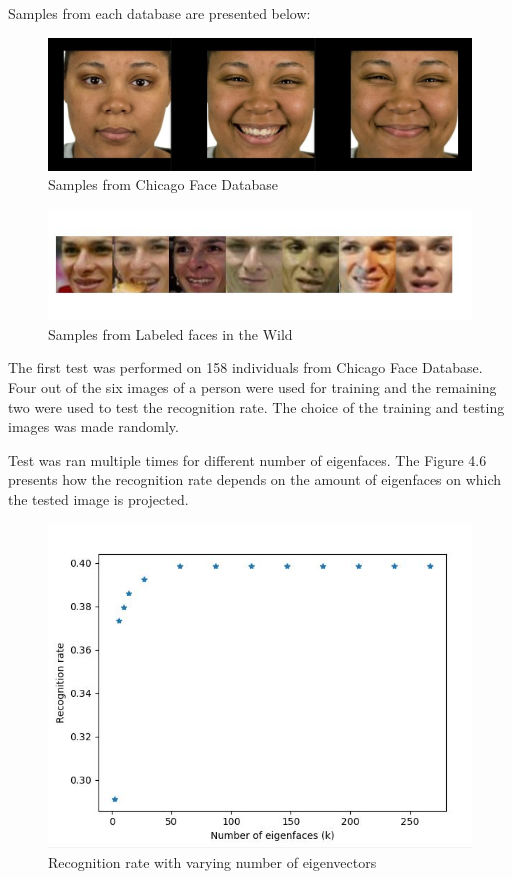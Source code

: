 Samples from each database are presented below:

\begin{figure}[H]
\centering
\includegraphics[scale=0.3]{CFD_samples.jpg}
\caption{Samples from Chicago Face Database}
\end{figure} 


\begin{figure}[H]
\centering
\includegraphics[scale=0.7]{lfw_samples.jpg}
\caption{Samples from Labeled faces in the Wild}
\end{figure} 

The first test was performed on 158 individuals from Chicago Face Database. Four out of the six images of a person were used for training and the remaining two were used to test the recognition rate. The choice of the training and testing images was made randomly.

Test was ran multiple times for different number of eigenfaces. The Figure 4.6 presents how the recognition rate depends on the amount of eigenfaces on which the tested image is projected. 

\begin{figure}[H]
\centering
\includegraphics[scale=0.7]{rec_rate_vs_number_of_eigenfaces.jpg}
\caption{Recognition rate with varying number of eigenvectors}
\end{figure} 

